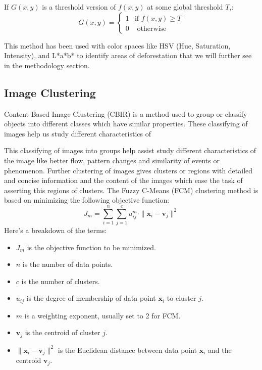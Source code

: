 \documentclass[12pt,a4paper,IEEEtran]{article}
\begin{document}
If $G(x,y)$ is a threshold version of $f(x,y)$ at some global threshold $T$,:
\[G(x,y) =
\begin{cases}
1 & \text{if } f(x,y) \geq T\\
0 & \text{ otherwise}
\end{cases}
\]

This method has been used with color spaces like HSV (Hue, Saturation, Intensity), and L*a*b* to identify areas of deforestation that we will further see in the methodology section.


\subsection[3.2]{Image Clustering} 
Content Based Image Clustering (CBIR) is a method used to group or classify objects into different classes which have similar properties. These classifying of images help us study different characteristics of 

This classifying of images into groups help assist study different characteristics of the image like better flow, pattern changes and similarity of events or phenomenon. Further clustering of images gives clusters or regions with detailed and concise information and the content of the images which ease the task of asserting this regions of clusters. 
\newpage The Fuzzy C-Means (FCM) clustering method \cite{BEZDEK1984191} is based on minimizing the following objective function:
\begin{equation}
J_m = \sum_{i=1}^{n} \sum_{j=1}^{c} u_{ij}^m \cdot \|\mathbf{x}_i - \mathbf{v}_j\|^2
\end{equation}
\newline Here's a breakdown of the terms:
\begin{itemize}
    \item $J_m$ is the objective function to be minimized.
    \item $n$ is the number of data points.
    \item $c$ is the number of clusters.
    \item $u_{ij}$ is the degree of membership of data point $\mathbf{x}_i$ to cluster $j$.
    \item $m$ is a weighting exponent, usually set to 2 for FCM.
    \item $\mathbf{v}_j$ is the centroid of cluster $j$.
    \item $\|\mathbf{x}_i - \mathbf{v}_j\|^2$ is the Euclidean distance between data point $\mathbf{x}_i$ and the centroid $\mathbf{v}_j$.
\end{itemize}
\end{document}
